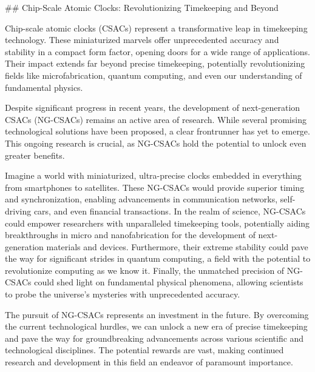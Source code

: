 ## Chip-Scale Atomic Clocks: Revolutionizing Timekeeping and Beyond

Chip-scale atomic clocks (CSACs) represent a transformative leap in timekeeping technology. These miniaturized marvels offer unprecedented accuracy and stability in a compact form factor, opening doors for a wide range of applications. Their impact extends far beyond precise timekeeping, potentially revolutionizing fields like microfabrication, quantum computing, and even our understanding of fundamental physics.

Despite significant progress in recent years, the development of next-generation CSACs (NG-CSACs) remains an active area of research. While several promising technological solutions have been proposed, a clear frontrunner has yet to emerge. This ongoing research is crucial, as NG-CSACs hold the potential to unlock even greater benefits.

Imagine a world with miniaturized, ultra-precise clocks embedded in everything from smartphones to satellites. These NG-CSACs would provide superior timing and synchronization, enabling advancements in communication networks, self-driving cars, and even financial transactions. In the realm of science, NG-CSACs could empower researchers with unparalleled timekeeping tools, potentially aiding breakthroughs in micro and nanofabrication for the development of next-generation materials and devices. Furthermore, their extreme stability could pave the way for significant strides in quantum computing, a field with the potential to revolutionize computing as we know it. Finally, the unmatched precision of NG-CSACs could shed light on fundamental physical phenomena, allowing scientists to probe the universe's mysteries with unprecedented accuracy.

The pursuit of NG-CSACs represents an investment in the future. By overcoming the current technological hurdles, we can unlock a new era of precise timekeeping and pave the way for groundbreaking advancements across various scientific and technological disciplines. The potential rewards are vast, making continued research and development in this field an endeavor of paramount importance.